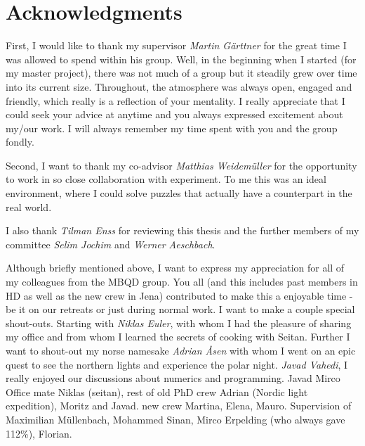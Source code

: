 
\bigskip

\begingroup
\let\clearpage\relax
\let\cleardoublepage\relax
\let\cleardoublepage\relax
\chapter*{Acknowledgments}
First, I would like to thank my supervisor \emph{Martin Gärttner} for the great time I was allowed to spend within his group. Well, in the beginning when I started (for my master project), there was not much of a group but it steadily grew over time into its current size. Throughout, the atmosphere was always open, engaged and friendly, which really is a reflection of your mentality. I really appreciate that I could seek your advice at anytime and you always expressed excitement about my/our work. I will always remember my time spent with you and the group fondly.

Second, I want to thank my co-advisor \emph{Matthias Weidemüller} for the opportunity to work in so close collaboration with experiment. To me this was an ideal environment, where I could solve puzzles that actually have a counterpart in the real world. %

I also thank \emph{Tilman Enss} for reviewing this thesis and the further members of my committee \emph{Selim Jochim} and \emph{Werner Aeschbach}.

Although briefly mentioned above, I want to express my appreciation for all of my colleagues from the MBQD group. You all (and this includes past members in HD as well as the new crew in Jena) contributed to make this a enjoyable time - be it on our retreats or just during normal work.
I want to make a couple special shout-outs. Starting with \emph{Niklas Euler}, with whom I had the pleasure of sharing my office and from whom I learned the secrets of cooking with Seitan. Further I want to shout-out my norse namesake \emph{Adrian \AA sen} with whom I went on an epic quest to see the northern lights and experience the polar night. \emph{Javad Vahedi}, I really enjoyed our discussions about numerics and programming.
Javad
Mirco
Office mate Niklas (seitan), rest of old PhD crew Adrian (Nordic light expedition), Moritz and Javad. new crew Martina, Elena, Mauro. 
Supervision of Maximilian Müllenbach, Mohammed Sinan, Mirco Erpelding (who always gave 112\%), Florian.

